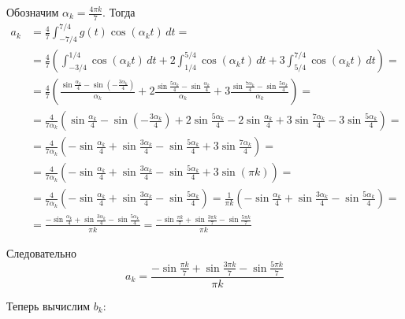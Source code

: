 \documentclass[12pt,a4paper]{article}
\begin{document}
Обозначим $ \alpha_k=\frac{4\pi k}{7} $. Тогда
\begin{align*}
a_k
&=
\frac47
\int_{-7/4}^{7/4}
g(t)\cos(\alpha_k t)\,dt = \\
&=
\frac47
\left(
\int_{-3/4}^{1/4}\cos(\alpha_k t)\,dt
+
2\int_{1/4}^{5/4}\cos(\alpha_k t)\,dt
+
3\int_{5/4}^{7/4}\cos(\alpha_k t)\,dt
\right) = \\
&=
\frac47
\left(
\frac{\sin\frac{\alpha_k}{4}-\sin\left(-\frac{3\alpha_k}{4}\right)}{\alpha_k}
+
2\frac{\sin\frac{5\alpha_k}{4}-\sin\frac{\alpha_k}{4}}{\alpha_k}
+
3\frac{\sin\frac{7\alpha_k}{4}-\sin\frac{5\alpha_k}{4}}{\alpha_k}
\right) = \\
&=
\frac4{7\alpha_k}
\left(
\sin\frac{\alpha_k}{4}
-
\sin\left(-\frac{3\alpha_k}{4}\right)
+
2\sin\frac{5\alpha_k}{4}
-
2\sin\frac{\alpha_k}{4}
+
3\sin\frac{7\alpha_k}{4}
-
3\sin\frac{5\alpha_k}{4}
\right) = \\
&=
\frac4{7\alpha_k}
\left(
-\sin\frac{\alpha_k}{4}
+
\sin\frac{3\alpha_k}{4}
-
\sin\frac{5\alpha_k}{4}
+
3\sin\frac{7\alpha_k}{4}
\right) = \\
&=
\frac4{7\alpha_k}
\left(
-\sin\frac{\alpha_k}{4}
+
\sin\frac{3\alpha_k}{4}
-
\sin\frac{5\alpha_k}{4}
+
3\sin(\pi k)
\right) = \\
&=
\frac4{7\alpha_k}
\left(
-\sin\frac{\alpha_k}{4}
+
\sin\frac{3\alpha_k}{4}
-
\sin\frac{5\alpha_k}{4}
\right) =
\frac1{\pi k}
\left(
-\sin\frac{\alpha_k}{4}
+
\sin\frac{3\alpha_k}{4}
-
\sin\frac{5\alpha_k}{4}
\right) = \\
&=
\frac{
-\sin\frac{\alpha_k}{4}
+
\sin\frac{3\alpha_k}{4}
-
\sin\frac{5\alpha_k}{4}
}{\pi k}
=
\frac{
-\sin\frac{\pi k}{7}
+
\sin\frac{3\pi k}{7}
-
\sin\frac{5\pi k}{7}
}{\pi k}
\end{align*}

Следовательно
\[
a_k
=
\frac{
-\sin\frac{\pi k}{7}
+
\sin\frac{3\pi k}{7}
-
\sin\frac{5\pi k}{7}
}{\pi k}
\]

Теперь вычислим $b_k$:
\end{document}
